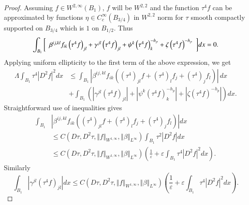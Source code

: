 \documentclass[12pt,leqno]{amsart}%
\theoremstyle{plain}
\numberwithin{equation}{section}
\theoremstyle{definition}
\begin{document}
\begin{proof}
Assuming $f\in W^{2,\infty}(B_{1})$, $f$ will be $W^{2,2}$ and the function
$\tau^{4}f$ can be approximated by functions $\eta\in C_{c}^{\infty}(B_{3/4})$
in $W^{2,2}$ norm for $\tau$ smooth compactly supported on $B_{3/4}$ which is
$1$ on $B_{1/2}.$ Thus
\[
\int_{B_{1}}\bigg[
\begin{array}
[c]{c}%
\beta^{ij,kl}f_{ik}\left(  \tau^{4}f\right)  _{jl}+\gamma^{jl}\left(  \tau
^{4}f\right)  _{jl} +\psi^{k} \left(  \tau^{4}f\right)  _{k}^{-h_{p}}%
+\zeta\left(  \tau^{4}f\right)  ^{-h_{p}}%
\end{array}
\bigg]dx=0.
\]
Applying uniform ellipticity to the first term of the above expression, we
get
\begin{align}
\Lambda\int_{B_{1}}\tau^{4}\left\vert D^{2}f\right\vert ^{2}dx  &  \leq
\int_{B_{1}}\left\vert \beta^{ij,kl}f_{ik}\left(  \left(  \tau^{4}\right)
_{jl}f+\left(  \tau^{4}\right)  _{l}f_{j}+\left(  \tau^{4}\right)  _{j}%
f_{l}\right)  \right\vert \, dx\label{term3b}\\
&  +\int_{B_{1}}\left(  \left\vert \gamma^{jl}\left(  \tau^{4}f\right)
_{jl}\right\vert +\left\vert \psi^{k} \left(  \tau^{4}f\right)  _{k}^{-h_{p}%
}\right\vert +\left\vert \zeta\left(  \tau^{4}f\right)  ^{-h_{p}}\right\vert
\right)  dx.\nonumber
\end{align}
Straightforward use of inequalities gives%
\begin{align*}
\int_{B_{1}}  &  \left\vert \beta^{ij,kl}f_{ik}\left(  \left(  \tau
^{4}\right)  _{jl}f+\left(  \tau^{4}\right)  _{l}f_{j}+\left(  \tau
^{4}\right)  _{j}f_{l}\right)  \right\vert dx\\
&  \leq C\left(  D\tau,D^{2}\tau,\left\Vert f\right\Vert _{W^{1,\infty}%
},\left\Vert \beta\right\Vert _{L^{\infty}}\right)  \int_{B_{1}}\tau
^{2}\left\vert D^{2}f\right\vert dx\\
&  \leq C\left(  D\tau,D^{2}\tau,\left\Vert f\right\Vert _{W^{1,\infty}%
},\left\Vert \beta\right\Vert _{L^{\infty}}\right)  \left(  \frac
{1}{\varepsilon}+\varepsilon\int_{B_{1}}\tau^{4}\left\vert D^{2}f\right\vert
^{2}dx\right)  .
\end{align*}
Similarly%
\begin{equation}
\int_{B_{1}}\left\vert \gamma^{jl}\left(  \tau^{4}f\right)  _{jl}\right\vert
dx\leq C\left(  D\tau,D^{2}\tau,\left\Vert f\right\Vert _{W^{1,\infty}%
},\left\Vert \beta\right\Vert _{L^{\infty}}\right)  \left(  \frac
{1}{\varepsilon}+\varepsilon\int_{B_{1}}\tau^{4}\left\vert D^{2}f\right\vert
^{2}dx\right)  . \label{term2b}%

\end{equation}
\end{proof}
\end{document}
